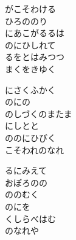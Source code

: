 \documentclass[10pt,b5j]{tarticle} %
\begin{document}
\vspace{1.5em} %
\newcommand{\linespace}{0.5em} %
\newcommand{\blocksize}{0.5\hsize} %
\begin{enumerate} %
    \begin{minipage}[c]{\blocksize}
    
        \vspace{\linespace}
        \item
        がこそわける\\
        ひろののり\\
        にあこがるるは\\
        のにひしれて\\
        るをとはみつつ\\
        まくをきゆく
        
        \vspace{\linespace}
        \item
        にさくふかく\\
        のにの\\
        のしづくのまたま\\
        にしとと\\
        ののにひびく\\
        こそわれのなれ
        
        \vspace{\linespace}
        \item
        るにみえて\\
        おぼろのの\\
        ののむく\\
        のにを\\
        くしらべはむ\\
        のなれや
        

\end{minipage}
\end{enumerate}
\end{document}

